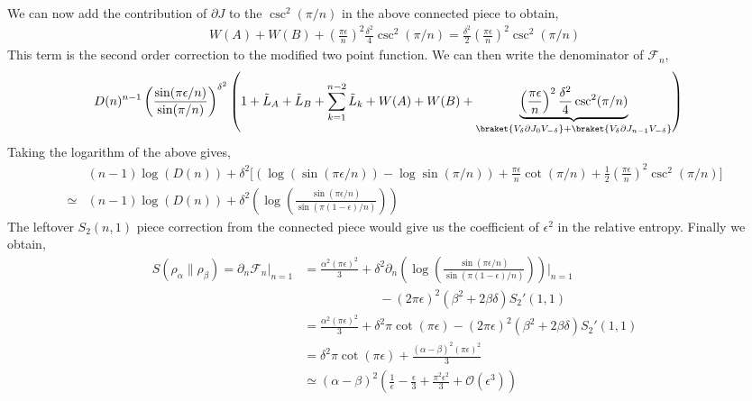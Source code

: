 \documentclass[11pt]{article}
\newcommand{\ep}{\epsilon}
\newcommand{\p}{\partial}
\newcommand{\mO}{\mathcal{O}}
\newcommand{\lb}{\left(}
\newcommand{\rb}{\right)}
\begin{document}
We can now add the contribution of $\p J$ to the $\csc^2(\pi /n)$ in the above connected piece to obtain,
\begin{align}
    W(A) + W(B) + \lb\frac{\pi \ep}{n}\rb^2 \frac{\delta^2}{4}\csc^2(\pi/n) = \frac{\delta^2}{2} \lb\frac{\pi \ep}{n}\rb^2 \csc^2(\pi/n)
\end{align}
This term is the second order correction to the modified two point function. We can then write the denominator of $\mathcal{F}_n$,
\begin{align}
   &D(n)^{n-1} \lb \frac{\sin (\pi \ep/n)}{\sin(\pi/n)}\rb^{\delta^2} \lb 1+ \tilde{L}_A + \tilde{L}_B + \sum_{k=1}^{n-2}\tilde{L}_k + W(A) + W(B) +\underbrace{\lb\frac{\pi \ep}{n}\rb^2 \frac{\delta^2}{4}\csc^2(\pi/n)}_{\braket{V_\delta \p J_0 V_{-\delta}} + \braket{V_\delta \p J_{n-1} V_{-\delta}}} \rb
\end{align}
Taking the logarithm of the above gives,
\begin{align}
    &(n-1)\log(D(n)) + \delta^2 \Bigg[ \lb \log (\sin (\pi \ep/n)) -  \log\sin(\pi/n)\rb + \frac{\pi \ep}{n} \cot(\pi /n) + \frac{1}{2}\lb\frac{\pi \ep}{n}\rb^2 \csc^2(\pi/n)\Bigg] \\
    \simeq &(n-1)\log(D(n)) + \delta^2 \lb \log \lb\frac{\sin(\pi\ep/n)}{\sin(\pi (1-\ep)/n)}\rb \rb
\end{align}
The leftover $S_2(n,1)$ piece correction from the connected piece would give us the coefficient of $\ep^2$ in the relative entropy. Finally we obtain,
\begin{align}
    S(\rho_\alpha \| \rho_\beta) = \p_n \mathcal{F}_n|_{n=1} &= \frac{\alpha^2 (\pi \ep)^2}{3} + \delta^2 \p_n  \lb \log \lb\frac{\sin(\pi\ep/n)}{\sin(\pi (1-\ep)/n)}\rb \rb\Bigg|_{n=1}\\&\qquad\qquad \qquad - (2\pi \ep)^2\lb \beta^2 + 2\beta \delta  \rb S_2'(1,1)\\&= \frac{\alpha^2 (\pi \ep)^2}{3} + \delta^2 \pi \cot(\pi \ep) - (2\pi \ep)^2\lb \beta^2 + 2\beta \delta  \rb S_2'(1,1) \\
    &=   \delta^2 \pi \cot(\pi \ep) +   \frac{(\alpha - \beta)^2(\pi \ep)^2}{3} \\
    &\simeq  (\alpha - \beta)^2 \lb \frac{1}{\ep} - \frac{\ep}{3} + \frac{\pi ^2 \ep^2}{3} + \mO(\ep^3)\rb
\end{align}
\end{document}
